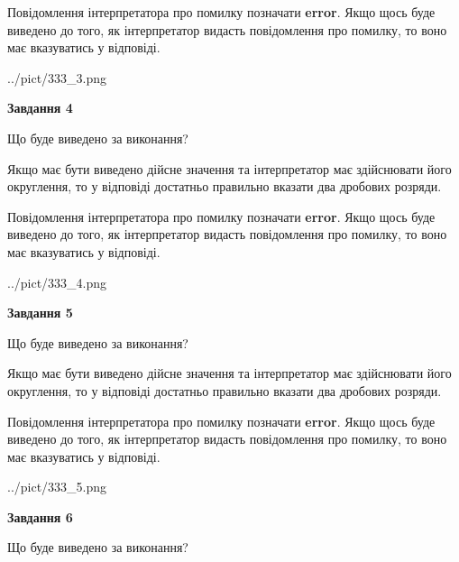 \documentclass[12pt, ukrainian]{article}
\begin{document}
{\begin {Large}
Повідомлення інтерпретатора про помилку позначати \textbf{error}.
Якщо щось буде виведено до того, як інтерпретатор видасть повідомлення про помилку, 
то воно має вказуватись у відповіді. \par

\begin{center}
	{../pict/333_3.png}
\end{center}
\newpage

{\begin {center}\textbf{Завдання 4}\end {center}}\par
Що буде виведено за виконання? \par

Якщо має бути виведено дійсне значення та інтерпретатор має здійснювати його округлення, 
то у відповіді достатньо правильно вказати два дробових розряди.

Повідомлення інтерпретатора про помилку позначати \textbf{error}.
Якщо щось буде виведено до того, як інтерпретатор видасть повідомлення про помилку, 
то воно має вказуватись у відповіді. \par

\begin{center}
	{../pict/333_4.png}
\end{center}
\newpage

{\begin {center}\textbf{Завдання 5}\end {center}}\par
Що буде виведено за виконання? \par

Якщо має бути виведено дійсне значення та інтерпретатор має здійснювати його округлення, 
то у відповіді достатньо правильно вказати два дробових розряди.

Повідомлення інтерпретатора про помилку позначати \textbf{error}.
Якщо щось буде виведено до того, як інтерпретатор видасть повідомлення про помилку, 
то воно має вказуватись у відповіді. \par

\begin{center}
	{../pict/333_5.png}
\end{center}
\newpage

{\begin {center}\textbf{Завдання 6}\end {center}}\par
Що буде виведено за виконання? \par


\end{Large}}
\end{document}
